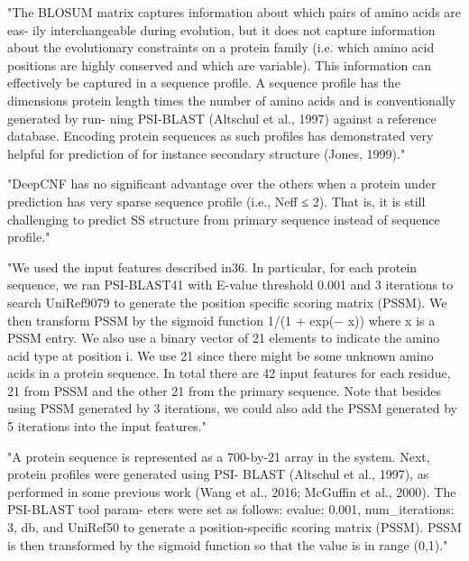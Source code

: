 \documentclass[]{scrartcl}
\begin{document}
"The BLOSUM matrix captures information about which pairs of amino acids are eas- ily interchangeable during evolution, but it does not capture information about the evolutionary constraints on a protein family (i.e. which amino acid positions are highly conserved and which are variable). This information can effectively be captured in a sequence profile. A sequence profile has the dimensions protein length times the number of amino acids and is conventionally generated by run- ning PSI-BLAST (Altschul et al., 1997) against a reference database. Encoding protein sequences as such profiles has demonstrated very helpful for prediction of for instance secondary structure (Jones, 1999)." \cite{Jurtz2017}

"DeepCNF has no significant advantage over the others when a protein under prediction has very sparse sequence profile (i.e., Neff ≤ 2). That is, it is still challenging to predict SS structure from primary sequence instead of sequence profile." \cite{Wang2016}

"We used the input features described in36. In particular, for each protein sequence, we ran PSI-BLAST41 with E-value threshold 0.001 and 3 iterations to search UniRef9079 to generate the position specific scoring matrix (PSSM). We then transform PSSM by the sigmoid function 1/(1 + exp(− x)) where x is a PSSM entry. We also use a binary vector of 21 elements to indicate the amino acid type at position i. We use 21 since there might be some unknown amino acids in a protein sequence. In total there are 42 input features for each residue, 21 from PSSM and the other 21 from the primary sequence. Note that besides using PSSM generated by 3 iterations, we could also add the PSSM generated by 5 iterations into the input features." \cite{Wang2016}

"A protein sequence is represented as a 700-by-21 array in the system. Next, protein profiles were generated using PSI- BLAST (Altschul et al., 1997), as performed in some previous work (Wang et al., 2016; McGuffin et al., 2000). The PSI-BLAST tool param- eters were set as follows: evalue: 0.001, num\_iterations: 3, db, and UniRef50 to generate a position-specific scoring matrix (PSSM). PSSM is then transformed by the sigmoid function so that the value is in range (0,1)." \cite{Fang2017}
\end{document}
